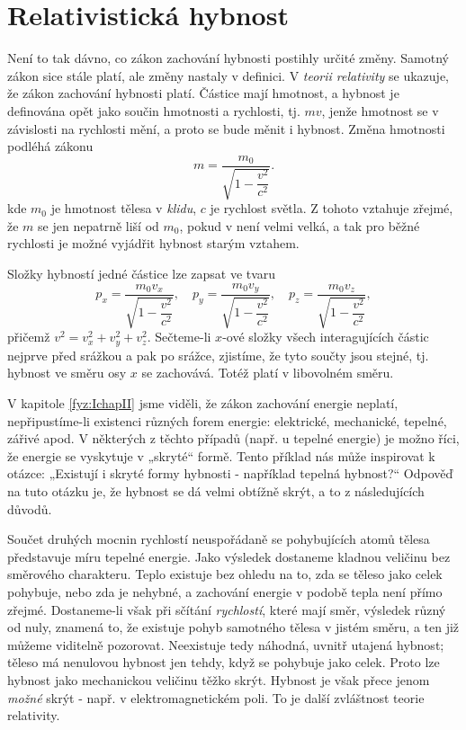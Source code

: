  \section{Relativistická hybnost}
    Není to tak dávno, co zákon zachování hybnosti postihly určité změny. Samotný zákon sice stále 
    platí, ale změny nastaly v definici. V \emph{teorii relativity} se ukazuje, že zákon zachování 
    hybnosti platí. Částice mají hmotnost, a hybnost je definována opět jako součin hmotnosti a 
    rychlosti, tj. \(mv\), jenže hmotnost se v závislosti na rychlosti mění, a proto se bude měnit 
    i hybnost. Změna hmotnosti podléhá zákonu
    \begin{equation}\label{FYZ:eq143}
      m = \dfrac{m_0}{\sqrt{1 - \dfrac{v^2}{c^2}}}.
    \end{equation}
    kde \(m_0\) je hmotnost tělesa v \emph{klidu}, \(c\) je rychlost světla. Z tohoto vztahuje 
    zřejmé, že \(m\) se jen nepatrně liší od \(m_0\), pokud v není velmi velká, a tak pro běžné 
    rychlosti je možné vyjádřit hybnost starým vztahem.
    
    Složky hybností jedné částice lze zapsat ve tvaru
    \begin{equation}\label{FYZ:eq144}
      p_x = \dfrac{m_0v_x}{\sqrt{1 - \dfrac{v^2}{c^2}}}, \quad
      p_y = \dfrac{m_0v_y}{\sqrt{1 - \dfrac{v^2}{c^2}}}, \quad
      p_z = \dfrac{m_0v_z}{\sqrt{1 - \dfrac{v^2}{c^2}}},
    \end{equation}
    přičemž \(v^2 = v_x^2 + v_y^2 + v_z^2\). Sečteme-li \(x\)-ové složky všech interagujících 
    částic nejprve před srážkou a pak po srážce, zjistíme, že tyto součty jsou stejné, tj. hybnost 
    ve směru osy \(x\) se zachovává. Totéž platí v libovolném směru.
    
    V kapitole \ref{fyz:IchapII} jsme viděli, že zákon zachování energie neplatí, nepřipustíme-li 
    existenci různých forem energie: elektrické, mechanické, tepelné, zářivé apod. V některých z 
    těchto případů (např. u tepelné energie) je možno říci, že energie se vyskytuje v „skryté“ 
    formě. Tento příklad nás může inspirovat k otázce: „Existují i skryté formy hybnosti - 
    například tepelná hybnost?“  Odpověď na tuto otázku je, že hybnost se dá velmi obtížně skrýt, a 
    to z následujících důvodů.
    
    Součet druhých mocnin rychlostí neuspořádaně se pohybujících atomů tělesa představuje míru 
    tepelné energie. Jako výsledek dostaneme kladnou veličinu bez směrového charakteru. Teplo 
    existuje bez ohledu na to, zda se těleso jako celek pohybuje, nebo zda je nehybné, a zachování 
    energie v podobě tepla není přímo zřejmé. Dostaneme-li však při sčítání \emph{rychlostí}, které 
    mají směr, výsledek různý od nuly, znamená to, že existuje pohyb samotného tělesa v jistém 
    směru, a ten již můžeme viditelně pozorovat. Neexistuje tedy náhodná, uvnitř utajená hybnost; 
    těleso má nenulovou hybnost jen tehdy, když se pohybuje jako celek. Proto lze hybnost jako 
    mechanickou veličinu těžko skrýt. Hybnost je však přece jenom \emph{možné} skrýt - např. v 
    elektromagnetickém poli. To je další zvláštnost teorie relativity.
    
